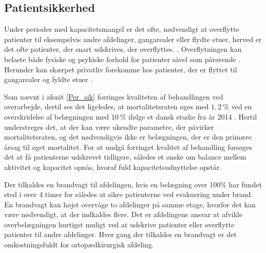 \subsection{Patientsikkerhed}
Under perioder med kapacitetsmangel er det ofte, nødvendigt at overflytte patienter til eksempelvis andre afdelinger, gangarealer eller flydte stuer, herved er det ofte patienter, der snart udskrives, der overflyttes. . Overflytningen kan belaste både fysiske og psykiske forhold for patienter såvel som pårørende \cite{Heidmann2014}. Herunder kan skærpet privatliv forekomme hos patienter, der er flyttet til gangarealer og fyldte stuer \cite{Madsen2014}. 

Som nævnt i afsnit \ref{Per_sik} forringes kvaliteten af behandlingen ved overarbejde, dertil ses det ligeledes, at mortalitetsraten øges med $1,2~\%$ ved en overskridelse af belægningen med $10~\%$ ifølge et dansk studie fra år 2014 \cite{Madsen2014}. Hertil understreges det, at der kan være ukendte parametre, der påvirker mortalitetsraten, og det nødvendigvis ikke er belægningen, der er den primære årsag til øget mortalitet.  For at undgå forringet kvalitet af behandling forsøges det at få patienterne udskrevet tidligere, således et ønske om balance mellem aktivitet og kapacitet opnås, hvoraf fuld kapacitetsudnyttelse opstår.


Der tilkaldes en brandvagt til afdelingen, hvis en belægning over 100\% har fundet sted i over 4 timer for således at sikre patienterne ved evakuering under brand. En brandvagt kan højst overvåge to afdelinger på samme etage, hvorfor det kan være nødvendigt, at der indkaldes flere. Det er afdelingens ansvar at afvikle overbelægningen hurtigst muligt ved at udskrive patienter eller overflytte patienter til andre afdelinger. \cite{Beredskab2016}  Hver gang der tilkaldes en brandvagt er det omkostningsfuldt for ortopædkirurgisk afdeling.  


